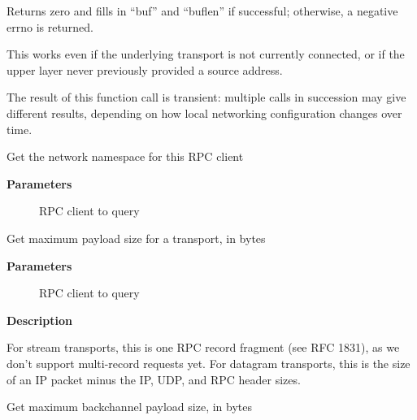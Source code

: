 \documentclass[a4paper,8pt,english]{sphinxmanual}
\begin{document}
Returns zero and fills in ``buf'' and ``buflen'' if successful;
otherwise, a negative errno is returned.

This works even if the underlying transport is not currently connected,
or if the upper layer never previously provided a source address.

The result of this function call is transient: multiple calls in
succession may give different results, depending on how local
networking configuration changes over time.

\begin{fulllineitems}
\label{networking/kapi:c.rpc_net_ns}
Get the network namespace for this RPC client

\end{fulllineitems}


\textbf{Parameters}
\begin{description}
\item[{}] \leavevmode
RPC client to query

\end{description}

\begin{fulllineitems}
\label{networking/kapi:c.rpc_max_payload}
Get maximum payload size for a transport, in bytes

\end{fulllineitems}


\textbf{Parameters}
\begin{description}
\item[{}] \leavevmode
RPC client to query

\end{description}

\textbf{Description}

For stream transports, this is one RPC record fragment (see RFC
1831), as we don't support multi-record requests yet.  For datagram
transports, this is the size of an IP packet minus the IP, UDP, and
RPC header sizes.

\begin{fulllineitems}
\label{networking/kapi:c.rpc_max_bc_payload}
Get maximum backchannel payload size, in bytes

\end{fulllineitems}
\end{document}
